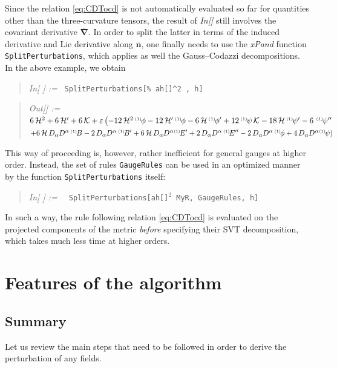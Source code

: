 \documentclass[notitlepage,onecolumn,floatfix,preprintnumbers,aps,prd,showpacs,nofootinbib,amsmath,amssymb,amsfonts]{revtex4-1}
\newcommand{\<}{\langle}
\renewcommand{\>}{\rangle}
\newcounter{inout}
\newcommand{\inoutput}{%
	\stepcounter{inout}%
	\theinout}
\newcommand{\pertbis}[2]{{}^{\mbox{\,\tiny $(#1)\!$}}{#2}}
\newcommand{\mathIn}[1]{
	\begin{quotation} {\em In[\inoutput] :=\ } {\tt #1} \end{quotation}}
\newcommand{\mathOutTwoLines}[2]{
	\begin{quotation} {\em Out[\theinout] :=\ } {\tt #1} \\ 
	\phantom{\em Out[\theinout] := \quad \;\,}  {\tt #2}\end{quotation}}
\newcommand{\ttgr}[1]{{#1}}
\newcommand{\bb}{{\ttgr{\alpha}}}
\begin{document}
Since the relation \eqref{eq:CDTocd} is not automatically evaluated so far for quantities other than the three-curvature tensors, 
the result of \textit{In[\theinout]} still involves the covariant derivative $\bm{\bar \nabla}$. In order to split the latter in terms 
of the induced derivative and Lie derivative along $\bm{\bar n}$, one finally needs to use the \textit{xPand} function {\tt SplitPerturbations}, 
which applies as well the Gauss--Codazzi decompositions. 
In the above example, we obtain 
%
\mathIn{SplitPerturbations[\% ah[]\^{}2 , h]}
\mathOutTwoLines{$%
	6 \, {\cal H}^2 + 6 \, {\cal H}' + 6 \, \mathcal{K} + 
	\varepsilon \left(-12 \, {\cal H}^2 \pertbis{1}{\phi} - 12 \, {\cal H}' \pertbis{1}{\phi} - 
	6 \, {\cal H} \pertbis{1}{\phi'} + 12 \pertbis{1}{\psi} \, {\cal K} - 18 \, {\cal H} \pertbis{1}{\psi'} - 
	6 \, \pertbis{1}{\psi''}\right.$}%
	{$\left. + 6 \, {\cal H} \, D_\bb D^\bb \pertbis{1}{B} - 2 \, D_\bb D^\bb \pertbis{1}{B'} + 
	6 \, {\cal H} \, D_\bb D^\bb \!\pertbis{1}{E'} + 2 \, D_\bb D^\bb \pertbis{1}{E''} - 
	2 \, D_\bb D^\bb \pertbis{1}{\phi} + 
	4 \, D_\bb D^\bb \!\pertbis{1}{\psi} \right)$}
%
This way of proceeding is, however, rather inefficient for general gauges at higher order. 
Instead, the set of rules {\tt GaugeRules} can be used in an optimized manner by the function {\tt SplitPerturbations} itself: 
%
\mathIn{ SplitPerturbations[ah[]${}^2$  MyR,\ GaugeRules,\ h]}
%
In such a way, the rule following relation \eqref{eq:CDTocd} is evaluated on the projected components of the metric 
\textit{before} specifying their SVT decomposition, which takes much less time at higher orders.


\section{Features of the algorithm} \label{sec:summarize}

\subsection{Summary}

Let us review the main steps that need to be followed in order to derive the perturbation of any fields. 
\end{document}
